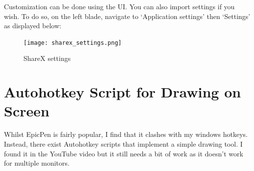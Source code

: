 Customization can be done using the UI. You can also import settings if you
wish. To do so, on the left blade, navigate to `Application settings' then
`Settings' as displayed below:
\begin{figure}[H]
    \centering
    \texttt{[image: sharex\_settings.png]}
    \caption{ShareX settings}
    \label{FigShareXSetting}
\end{figure}

\section{Autohotkey Script for Drawing on Screen}
Whilst EpicPen is fairly popular, I find that it clashes with my windows
hotkeys. Instead, there exist Autohotkey scripts that implement a simple drawing
tool. I found it in the YouTube video \cite{juho2021draw} but it still needs a
bit of work as it doesn't work for multiple monitors.
